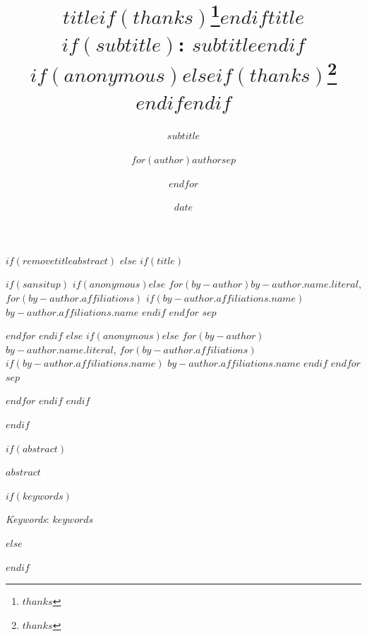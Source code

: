 \documentclass[
$if(fontsize)$
  $fontsize$,
$endif$
$if(lang)$
  $babel-lang$,
$endif$
$if(papersize)$
  $papersize$paper,
$endif$
$if(beamer)$
  ignorenonframetext,
$if(handout)$
  handout,
$endif$
$if(aspectratio)$
  aspectratio=$aspectratio$,
$endif$
$endif$
$for(classoption)$
  $classoption$$sep$,
$endfor$
]{$documentclass$}
\title{$title$$if(thanks)$\thanks{$thanks$}$endif$}
\subtitle{$subtitle$}
\author{$for(author)$$author$$sep$ \and $endfor$}
\date{$date$}
\institute{$for(institute)$$institute$$sep$ \and $endfor$}
\title{$title$$if(subtitle)$: $subtitle$$endif$$if(anonymous)$$else$$if(thanks)$\thanks{$thanks$} $endif$$endif$ }
\date{}
\renewenvironment{abstract}
 {{%
    \setlength{\leftmargin}{0mm}
    \setlength{\rightmargin}{\leftmargin}%
  }%
  \relax}
 {\endlist}
\begin{document}


$if(removetitleabstract)$
$else$
$if(title)$

{%
\setlength{\parindent}{0pt}
\thispagestyle{plain}
{%
\maketitle  %

}




{
   \vskip 13.5pt\relax \normalsize\fontsize{11}{12}
   $if(sansitup)$
$if(anonymous)$\hfill $else$
$for(by-author)$\MakeUppercase{\textsf{\large $by-author.name.literal$}}, 
\small{
$for(by-author.affiliations)$
$if(by-author.affiliations.name)$
$by-author.affiliations.name$
$endif$
$endfor$
}  $sep$ \par 
$endfor$ $endif$
$else$
$if(anonymous)$\hfill $else$
$for(by-author)$\MakeUppercase{$by-author.name.literal$}, 
\small{
$for(by-author.affiliations)$
$if(by-author.affiliations.name)$
$by-author.affiliations.name$
$endif$
$endfor$
}  $sep$ \par \vskip -3.5pt $endfor$ $endif$
$endif$

}

}


$endif$



$if(abstract)$



\begin{abstract}


    \vskip 8.5pt %

\noindent \small{$abstract$}

$if(keywords)$

\vskip 8.5pt \noindent \emph{Keywords}: $keywords$ \par



$else$


$endif$

\end{abstract}
\end{document}
